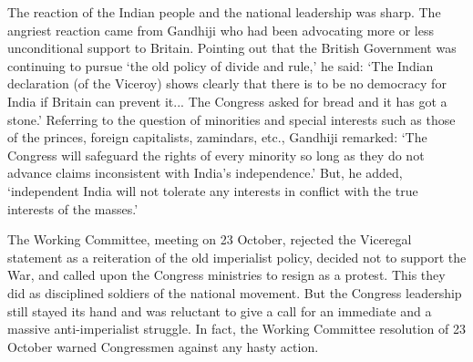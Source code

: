 The reaction of the Indian people and the national leadership was sharp. The angriest reaction came from Gandhiji who had been advocating more or less unconditional support to Britain. Pointing out that the British Government was continuing to pursue `the old policy of divide and rule,' he said: `The Indian declaration (of the Viceroy) shows clearly that there is to be no democracy for India if Britain can prevent it... The Congress asked for bread and it has got a stone.' Referring to the question of minorities and special interests such as those of the princes, foreign capitalists, zamindars, etc., Gandhiji remarked: `The Congress will safeguard the rights of every minority so long as they do not advance claims inconsistent with India's independence.' But, he added, `independent India will not tolerate any interests in conflict with the true interests of the masses.' 

The Working Committee, meeting on 23 October, rejected the Viceregal statement as a reiteration of the old imperialist policy, decided not to support the War, and called upon the Congress ministries to resign as a protest. This they did as disciplined soldiers of the national movement. But the Congress leadership still stayed its hand and was reluctant to give a call for an immediate and a massive anti-imperialist struggle. In fact, the Working Committee resolution of 23 October warned Congressmen against any hasty action. 

